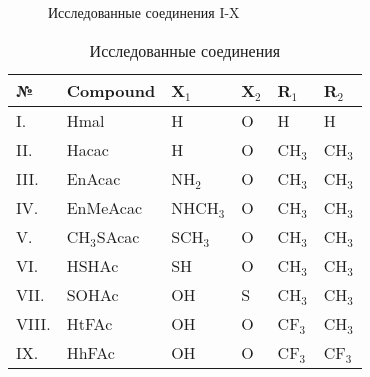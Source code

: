 \printnomenclature[3.5cm] %

\newpage

\begin{figure}[ht]
    \caption{Исследованные соединения I-X}
\label{RIS1}
\end{figure}

\begin{table} [htbp]%
    \centering
    \caption{Исследованные соединения}%
    \label{tab:comopund_list_1}%
    \renewcommand{\arraystretch}{1.5}%
    \begin{SingleSpace}
        \begin{tabular}{@{}@{\extracolsep{20pt}}llllll@{}} %
            \toprule     %
            №         & Compound        & X$_1$      & X$_2$  & R$_1$      & R$_2$      \\
            \midrule 
            I.        & Hmal            & H          & O      & H          & H          \\
            II.       & Hacac           & H          & O      & CH$_3$     & CH$_3$     \\
            III.      & EnAcac          & NH$_2$     & O      & CH$_3$     & CH$_3$     \\
            IV.       & EnMeAcac        & NHCH$_3$   & O      & CH$_3$     & CH$_3$     \\
            V.        & CH$_3$SAcac     & SCH$_3$    & O      & CH$_3$     & CH$_3$     \\
            VI.       & HSHAc           & SH         & O      & CH$_3$     & CH$_3$     \\
            VII.      & SOHAc           & OH         & S      & CH$_3$     & CH$_3$     \\
            VIII.     & HtFAc           & OH         & O      & CF$_3$     & CH$_3$     \\
            IX.       & HhFAc           & OH         & O      & CF$_3$     & CF$_3$     \\
            \bottomrule 
        \end{tabular}
    \end{SingleSpace}
\end{table}

